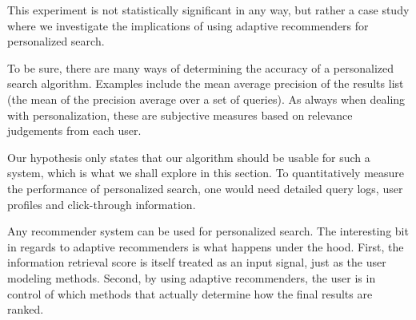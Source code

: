 \begin{comment}
\begin{table}[b]
  \centering
  \begin{tabular*}{0.7\textwidth}{ l l l l }
    \toprule
      ~ & 
      \emph{query} &
      \emph{scores} &
      \emph{IR weight} \\
    \midrule
    
    1 &
    [``new york or washington''] &
    combined &
    $1.0$ \\

    2 &
    [star trek] &
    combined &
    $0.3$ \\

    3 &
    [paris] &
    ratings &
    $0.0$ \\

    4 &
    [1998] &
    ratings &
    $0.0$ \\

    \bottomrule 
  \end{tabular*}
  \caption[List of Ranking Experiments]{List of ranking tests in this section.}
  \label{table:experiments:rank}
\end{table}
\end{comment}

This experiment is not statistically significant in any way,
but rather a case study where we investigate the implications
of using adaptive recommenders for personalized search.

To be sure, there are many ways of determining the accuracy of a personalized search
algorithm. Examples include the mean average precision of the results list
(the mean of the precision average over a set of queries).
As always when dealing with personalization, 
these are subjective measures based on relevance judgements from each user.

Our hypothesis only states that our algorithm should be usable for such 
a system, which is what we shall explore in this section.
To quantitatively measure the performance of personalized search,
one would need detailed query logs, user profiles and click-through information.

Any recommender system can be used for personalized search.
The interesting bit in regards to adaptive recommenders is what 
happens under the hood. First, the information retrieval score 
is itself treated as an input signal, just as the user modeling methods.
Second, by using adaptive recommenders, the user is in control of which
methods that actually determine how the final results are ranked.

